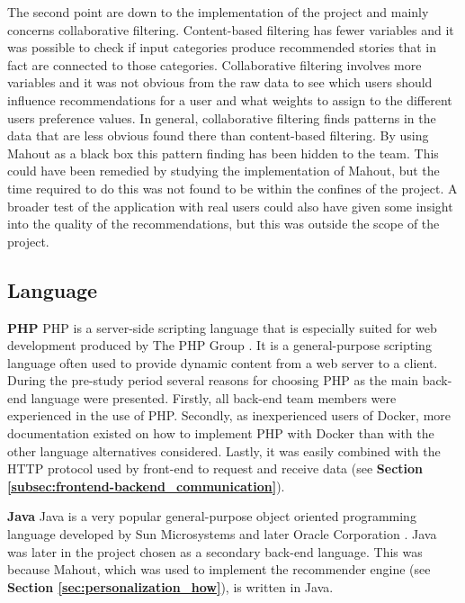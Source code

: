 The second point are down to the implementation of the project and mainly concerns collaborative filtering. Content-based filtering has fewer variables and it was possible to check if input categories produce recommended stories that in fact are connected to those categories. Collaborative filtering involves more variables and it was not obvious from the raw data to see which users should influence recommendations for a user and what weights to assign to the different users preference values. In general, collaborative filtering finds patterns in the data that are less obvious found there than content-based filtering. By using Mahout as a black box this pattern finding has been hidden to the team. This could have been remedied by studying the implementation of Mahout, but the time required to do this was not found to be within the confines of the project. A broader test of the application with real users could also have given some insight into the quality of the recommendations, but this was outside the scope of the project. \newline


\subsection{Language}
\label{subsec:backend_language}
\textbf{PHP}\newline
PHP is a server-side scripting language that is especially suited for web development produced by The PHP Group \cite{HM8}. It is a general-purpose scripting language often used to provide dynamic content from a web server to a client. During the pre-study period several reasons for choosing PHP as the main back-end language were presented. Firstly, all back-end team members were experienced in the use of PHP. Secondly, as inexperienced users of Docker, more documentation existed on how to implement PHP with Docker than with the other language alternatives considered. Lastly, it was easily combined with the HTTP protocol used by front-end to request and receive data (see \textbf{Section \ref{subsec:frontend-backend_communication}}).\newline

\noindent\textbf{Java}\newline
Java is a very popular general-purpose object oriented programming language developed by Sun Microsystems and later Oracle Corporation \cite{HM9}. Java was later in the project chosen as a secondary back-end language. This was because Mahout, which was used to implement the recommender engine (see \textbf{Section \ref{sec:personalization_how}}), is written in Java. 


